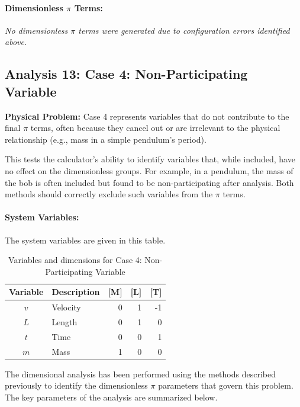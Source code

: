         \paragraph{Dimensionless $\pi$ Terms: }
        \textit{No dimensionless $\pi$ terms were generated due to configuration errors identified above.}


\subsection{Analysis 13: Case 4: Non-Participating Variable}
\label{sec:Case_4_NonParticipating_Variable}

\begin{problembox}
\textbf{Physical Problem:} Case 4 represents variables that do not contribute to the final $\pi$ terms, often because they cancel out or are irrelevant to the physical relationship (e.g., mass in a simple pendulum's period).
\end{problembox}

This tests the calculator's ability to identify variables that, while included, have no effect on the dimensionless groups. For example, in a pendulum, the mass of the bob is often included but found to be non-participating after analysis. Both methods should correctly exclude such variables from the $\pi$ terms.

\paragraph{System Variables: } The system variables are given in this table.

\begin{table}[H]
\centering
\begin{tabular}{|c|l|r|r|r|}
\hline
\textbf{Variable} & \textbf{Description} & \textbf{[M]} & \textbf{[L]} & \textbf{[T]} \\
\hline
$v$ & Velocity & 0 & 1 & -1 \\
$L$ & Length & 0 & 1 & 0 \\
$t$ & Time & 0 & 0 & 1 \\
$m$ & Mass & 1 & 0 & 0 \\

\hline
\end{tabular}
\caption{Variables and dimensions for Case 4: Non-Participating Variable}
\end{table}

The dimensional analysis has been performed using the methods described previously to identify the dimensionless $\pi$ parameters that govern this problem. The key parameters of the analysis are summarized below.

